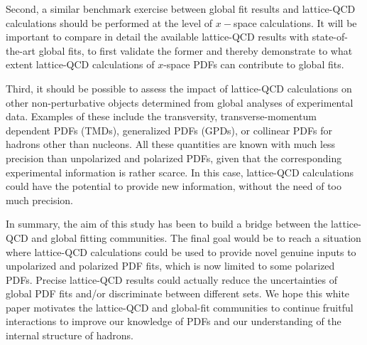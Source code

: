 Second, a similar benchmark exercise between global fit results and 
lattice-QCD calculations should be performed at the level of
$x-$space calculations.
%
It will be important to compare in detail the available lattice-QCD results 
with state-of-the-art global fits, to first validate the former and
thereby demonstrate to what extent lattice-QCD calculations of $x$-space PDFs 
can contribute to global fits.

Third, it should be possible to assess the impact of lattice-QCD 
calculations on other non-perturbative objects
determined from global analyses of experimental data.
%
Examples of these include the transversity, transverse-momentum dependent 
PDFs (TMDs), generalized PDFs (GPDs), or collinear PDFs for hadrons 
other than nucleons.
%
All these quantities are known with much less precision than unpolarized
and polarized PDFs, given that the corresponding experimental information
is rather scarce. 
%
In this case, lattice-QCD calculations could have the potential
to provide new information, without the need of too much precision.

In summary, the aim of this study has been to build a bridge between the 
lattice-QCD and global fitting communities.
%
The final goal would be to reach a situation where lattice-QCD calculations 
could be used to provide novel genuine inputs to unpolarized and polarized 
PDF fits, which is now limited to some polarized PDFs. 
%
Precise lattice-QCD results could actually reduce the uncertainties of
global PDF fits and/or discriminate between different sets.
%
We hope this white paper motivates the lattice-QCD and global-fit
communities to continue fruitful interactions to improve our knowledge of PDFs
and our understanding of the internal structure of hadrons.
